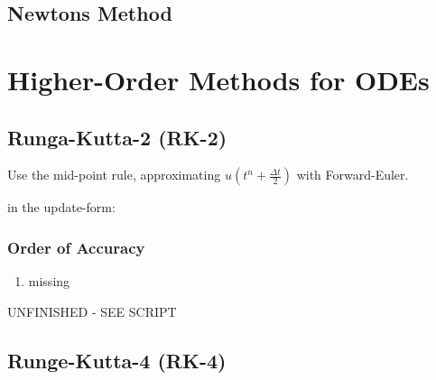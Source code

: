 \documentclass[10pt,a4paper]{scrartcl}
\begin{document}
\begin{multicols*}{3}
\subsection{Newtons Method}


\section{Higher-Order Methods for ODEs}

\subsection{Runga-Kutta-2 (RK-2)}



Use the mid-point rule, approximating $u(t^n+\frac{\Delta t}{2})$ with Forward-Euler.


in the update-form:


\subsubsection{Order of Accuracy}

\begin{enumerate}
\item missing
\end{enumerate}

UNFINISHED - SEE SCRIPT

\subsection{Runge-Kutta-4 (RK-4)}


\end{multicols*}
\end{document}
